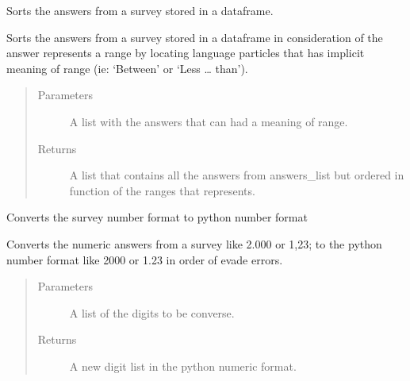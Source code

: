 \documentclass[letterpaper,10pt,english]{sphinxmanual}
\begin{document}
\begin{fulllineitems}
\label{\detokenize{index:SurveyHumpbackWhale.smart_answers_sort}}
Sorts the answers from a survey stored in a dataframe.

Sorts the answers from a survey stored in a dataframe in consideration
of the answer represents a range by locating language particles that has
implicit meaning of range (ie: ‘Between’ or ‘Less … than’).
\begin{quote}\begin{description}
\item[{Parameters}] \leavevmode
{} \textendash{} A list with the answers that can had a meaning of range.

\item[{Returns}] \leavevmode
A list that contains all the answers from answers\_list but ordered in
function of the ranges that represents.

\end{description}\end{quote}

\end{fulllineitems}


\begin{fulllineitems}
\label{\detokenize{index:SurveyHumpbackWhale.smart_digit_conversion}}
Converts the survey number format to python number format

Converts the numeric answers from a survey like 2.000 or 1,23; to the
python number format like 2000 or 1.23 in order of evade errors.
\begin{quote}\begin{description}
\item[{Parameters}] \leavevmode
{} \textendash{} A list of the digits to be converse.

\item[{Returns}] \leavevmode
A new digit list in the python numeric format.

\end{description}\end{quote}

\end{fulllineitems}
\end{document}

